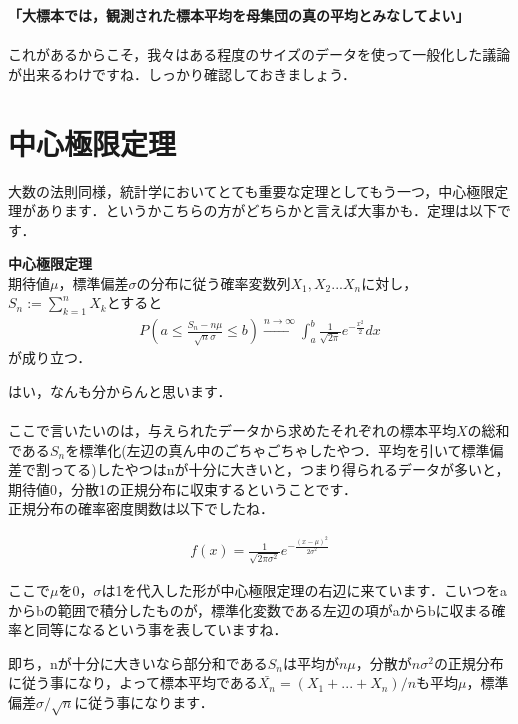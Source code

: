 \documentclass[11pt,a4paper,uplatex]{ujreport} 	%
\begin{document}
\textbf{「大標本では，観測された標本平均を母集団の真の平均とみなしてよい」}\\
\\

これがあるからこそ，我々はある程度のサイズのデータを使って一般化した議論が出来るわけですね．しっかり確認しておきましょう．


\section{中心極限定理}
大数の法則同様，統計学においてとても重要な定理としてもう一つ，中心極限定理があります．というかこちらの方がどちらかと言えば大事かも．定理は以下です．\\

\begin{screen}
  \textbf{中心極限定理}\\
  期待値$\mu$，標準偏差$\sigma$の分布に従う確率変数列$X_1,X_2...X_n$に対し，$S_n := \sum_{k=1}^n X_k$とすると
  \begin{align}
    P(a \leq \frac{S_n -n\mu}{\sqrt{n}\sigma} \leq b) \xrightarrow{n\rightarrow\infty} \int_a^b \frac{1}{\sqrt{2\pi}}e^{-\frac{x^2}{2}}dx
  \end{align}
  が成り立つ．
\end{screen}

はい，なんも分からんと思います．\\
\\

ここで言いたいのは，与えられたデータから求めたそれぞれの標本平均$X$の総和である$S_n$を標準化(左辺の真ん中のごちゃごちゃしたやつ．平均を引いて標準偏差で割ってる)したやつはnが十分に大きいと，つまり得られるデータが多いと，期待値0，分散1の正規分布に収束するということです．\\

正規分布の確率密度関数は以下でしたね．

\begin{align}
  f(x) = \frac{1}{\sqrt{2\pi\sigma^2}}e^{-\frac{(x-\mu)^2}{2\sigma^2}}
\end{align}

ここで$\mu$を0，$\sigma$は1を代入した形が中心極限定理の右辺に来ています．こいつをaからbの範囲で積分したものが，標準化変数である左辺の項がaからbに収まる確率と同等になるという事を表していますね．

即ち，nが十分に大きいなら部分和である$S_n$は平均が$n\mu$，分散が$n\sigma^2$の正規分布に従う事になり，よって標本平均である$\bar{X_n}=(X_1+...+X_n)/n$も平均$\mu$，標準偏差$\sigma/\sqrt{n}$に従う事になります．\\
\\
\end{document}
